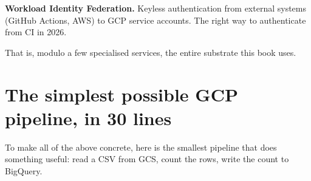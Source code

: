 \documentclass[
  11pt,
  british,
  oneside]{book}
\begin{document}
\textbf{Workload Identity
Federation.} Keyless authentication
from external systems (GitHub Actions, AWS) to GCP service accounts. The
right way to authenticate from CI in 2026.

That is, modulo a few specialised services, the entire substrate this
book uses.

\hypertarget{the-simplest-possible-gcp-pipeline-in-30-lines}{%
\section{The simplest possible GCP pipeline, in 30
lines}\label{the-simplest-possible-gcp-pipeline-in-30-lines}}

To make all of the above concrete, here is the smallest pipeline that
does something useful: read a CSV from GCS, count the rows, write the
count to BigQuery.
\end{document}
